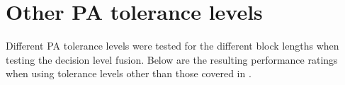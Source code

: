 %
%
%

\section{Other PA tolerance levels}
\label{sec:app-other-ANGAs}
Different PA tolerance levels were tested for the different block lengths when testing the decision level fusion.
Below are the resulting performance ratings when using tolerance levels other than those covered in .

